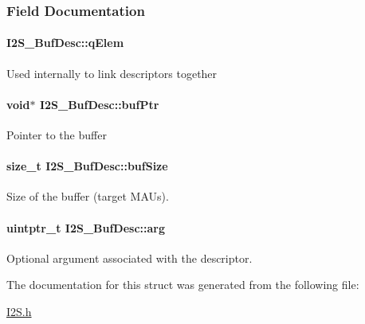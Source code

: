 \subsubsection{Field Documentation}
\paragraph[{q\+Elem}]{ I2\+S\+\_\+\+Buf\+Desc\+::q\+Elem}\label{struct_i2_s___buf_desc_a0d0512ad9692e7eb4d486c1238cb75ce}
Used internally to link descriptors together 
\paragraph[{buf\+Ptr}]{\setlength{\rightskip}{0pt plus 5cm}void$\ast$ I2\+S\+\_\+\+Buf\+Desc\+::buf\+Ptr}\label{struct_i2_s___buf_desc_a63edcc97dba1524e4a63a055a6face33}
Pointer to the buffer 
\paragraph[{buf\+Size}]{\setlength{\rightskip}{0pt plus 5cm}size\+\_\+t I2\+S\+\_\+\+Buf\+Desc\+::buf\+Size}\label{struct_i2_s___buf_desc_a2d650ead8a0d337cb4d292e52e1a02c5}
Size of the buffer (target M\+A\+Us). 
\paragraph[{arg}]{\setlength{\rightskip}{0pt plus 5cm}uintptr\+\_\+t I2\+S\+\_\+\+Buf\+Desc\+::arg}\label{struct_i2_s___buf_desc_a572be4bbbf39c6d7a0745829684676e1}
Optional argument associated with the descriptor. 

The documentation for this struct was generated from the following file\+:\begin{DoxyCompactItemize}
\item 
\hyperlink{_i2_s_8h}{I2\+S.\+h}\end{DoxyCompactItemize}
